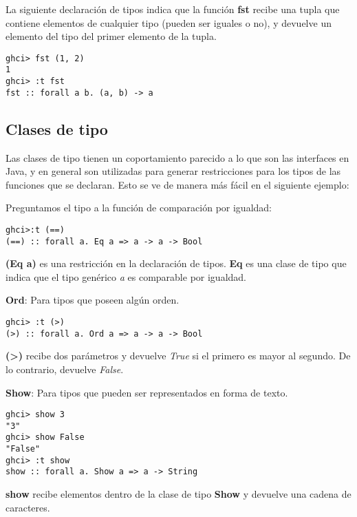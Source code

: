La siguiente declaración de tipos indica que la función \textbf{fst} recibe una tupla que contiene elementos de cualquier tipo (pueden ser iguales o no), y devuelve un elemento del tipo del primer elemento de la tupla.

\begin{lstlisting}
ghci> fst (1, 2)
1
ghci> :t fst
fst :: forall a b. (a, b) -> a
\end{lstlisting}


\subsection{Clases de tipo} %
\label{sub:clases_de_tipo}


Las clases de tipo tienen un coportamiento parecido a lo que son las interfaces en Java, y en general son utilizadas para generar restricciones para los tipos de las funciones que se declaran. Esto se ve de manera más fácil en el siguiente ejemplo:

Preguntamos el tipo a la función de comparación por igualdad:

\begin{lstlisting}
ghci>:t (==)
(==) :: forall a. Eq a => a -> a -> Bool
\end{lstlisting}

\textbf{(Eq a)} es una restricción en la declaración de tipos.
\textbf{Eq} es una clase de tipo que indica que el tipo genérico \textit{a} es comparable por igualdad.

\textbf{Ord}: Para tipos que poseen algún orden.

\begin{lstlisting}
ghci> :t (>)
(>) :: forall a. Ord a => a -> a -> Bool
\end{lstlisting}

\textbf{(>)} recibe dos parámetros y devuelve \textit{True} si el primero es mayor al segundo. De lo contrario, devuelve \textit{False}.

\textbf{Show}: Para tipos que pueden ser representados en forma de texto.

\begin{lstlisting}
ghci> show 3
"3"
ghci> show False
"False"
ghci> :t show
show :: forall a. Show a => a -> String
\end{lstlisting}

\textbf{show} recibe elementos dentro de la clase de tipo \textbf{Show} y devuelve una cadena de caracteres.

